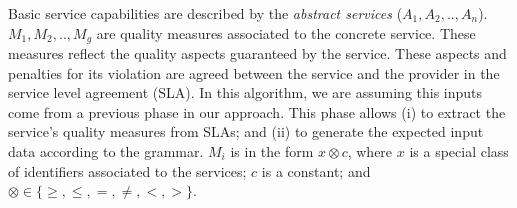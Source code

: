 \begin{defi}
Basic service capabilities are described by the \textit{abstract services} ($A_{1}, A_{2}, .., A_{n}$).
$M_{1},M_{2}, .., M_{g}$ are quality measures associated to the concrete service. 
These measures reflect the quality aspects guaranteed by the service. These aspects and penalties for its violation are agreed between the service and the provider in the service level agreement (SLA).
%
In this algorithm, we are assuming this inputs come from a previous phase in our approach.
This phase allows (i) to extract the service's quality measures from SLAs; and (ii) to generate the expected input data according to the grammar.
%
$M_{i}$ is in the form $x \otimes c$, where $x$ is a special class of identifiers associated to the services; $c$ is a constant; and $\otimes \in\lbrace \geq, \leq, =, \neq, <, >\rbrace$.

\end{defi}
 
